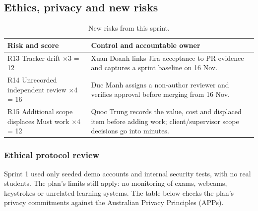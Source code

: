 \documentclass[11pt,a4paper]{article}
\begin{document}
\subsection{Ethics, privacy and new risks}
{\small
\begin{longtable}{>{\raggedright\arraybackslash}p{}>{\raggedright\arraybackslash}p{}}
\caption{New risks from this sprint.}\\
\toprule
\textbf{Risk and score} & \textbf{Control and accountable owner} \\
\midrule
\endhead
R13 Tracker drift \newline 4$\times$3 = 12 & Xuan Doanh links Jira acceptance to PR evidence and captures a sprint baseline on 16 Nov. \\
R14 Unrecorded independent review \newline 4$\times$4 = 16 & Duc Manh assigns a non-author reviewer and verifies approval before merging from 16 Nov. \\
R15 Additional scope displaces Must work \newline 3$\times$4 = 12 & Quoc Trung records the value, cost and displaced item before adding work; client/supervisor scope decisions go into minutes. \\
\bottomrule
\end{longtable}}
\subsubsection{Ethical protocol review}
Sprint 1 used only seeded demo accounts and internal security tests, with no real students. The plan's limits still apply: no monitoring of exams, webcams, keystrokes or unrelated learning systems. The table below checks the plan's privacy commitments against the Australian Privacy Principles (APPs).
\end{document}
